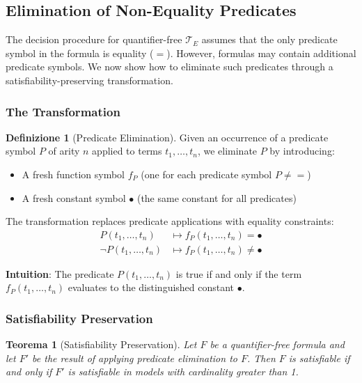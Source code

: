 \documentclass[11pt,a4paper]{article}
\theoremstyle{definition}
\newtheorem{definition}{Definizione}[section]
\theoremstyle{plain}
\newtheorem{theorem}{Teorema}[section]
\theoremstyle{remark}
\begin{document}
\subsection{Elimination of Non-Equality Predicates}

The decision procedure for quantifier-free $\mathcal{T}_E$ assumes that the only predicate symbol in the formula is equality ($=$). However, formulas may contain additional predicate symbols. We now show how to eliminate such predicates through a satisfiability-preserving transformation.

\subsubsection{The Transformation}

\begin{definition}[Predicate Elimination]
Given an occurrence of a predicate symbol $P$ of arity $n$ applied to terms $t_1, \dots, t_n$, we eliminate $P$ by introducing:
\begin{itemize}
    \item A fresh function symbol $f_P$ (one for each predicate symbol $P \neq {=}$)
    \item A fresh constant symbol $\bullet$ (the same constant for all predicates)
\end{itemize}

The transformation replaces predicate applications with equality constraints:
\begin{align*}
P(t_1, \dots, t_n) &\mapsto f_P(t_1, \dots, t_n) = \bullet \\
\neg P(t_1, \dots, t_n) &\mapsto f_P(t_1, \dots, t_n) \neq \bullet
\end{align*}
\end{definition}

\textbf{Intuition}: The predicate $P(t_1, \dots, t_n)$ is true if and only if the term $f_P(t_1, \dots, t_n)$ evaluates to the distinguished constant $\bullet$.

\subsubsection{Satisfiability Preservation}

\begin{theorem}[Satisfiability Preservation]
Let $F$ be a quantifier-free formula and let $F'$ be the result of applying predicate elimination to $F$. Then $F$ is satisfiable if and only if $F'$ is satisfiable in models with cardinality greater than 1.
\end{theorem}
\end{document}
